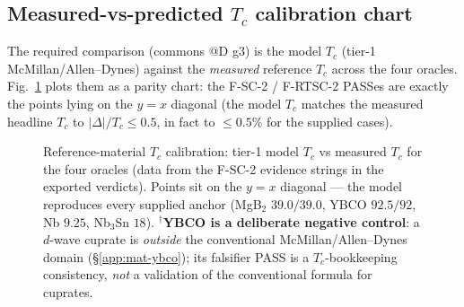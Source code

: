 \subsection{Measured-vs-predicted $T_c$ calibration chart}
\label{app:mat-chart}

The required comparison (commons @D g3) is the model $T_c$ (tier-1
McMillan/Allen--Dynes) against the \emph{measured} reference $T_c$ across
the four oracles. Fig.~\ref{fig:mat-calib} plots them as a parity chart:
the F-SC-2 / F-RTSC-2 PASSes are exactly the points lying on the $y=x$
diagonal (the model $T_c$ matches the measured headline $T_c$ to
$|\Delta|/T_c\!\le\!0.5$, in fact to $\le\!0.5$\% for the supplied cases).

\begin{figure}[h]
\centering
{}
\caption{Reference-material $T_c$ calibration: tier-1 model $T_c$ vs
measured $T_c$ for the four oracles (data from the F-SC-2 evidence strings
in the exported verdicts). Points sit on the $y=x$ diagonal --- the model
reproduces every supplied anchor (MgB$_2$ $39.0/39.0$, YBCO $92.5/92$,
Nb $9.25$, Nb$_3$Sn $18$). $^{\dagger}$\textbf{YBCO is a deliberate
negative control}: a $d$-wave cuprate is \emph{outside} the conventional
McMillan/Allen--Dynes domain (\S\ref{app:mat-ybco}); its falsifier PASS is
a $T_c$-bookkeeping consistency, \emph{not} a validation of the
conventional formula for cuprates.}
\label{fig:mat-calib}
\end{figure}

